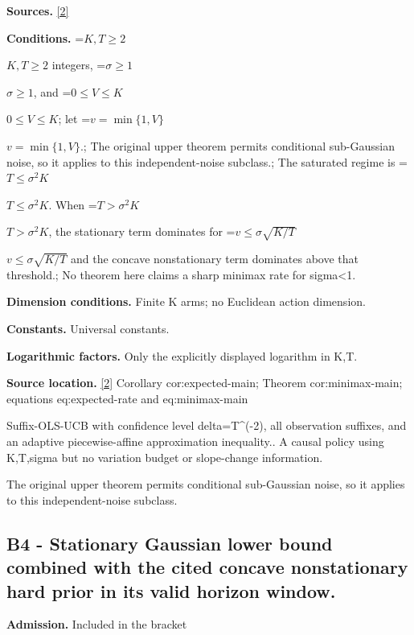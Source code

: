 \documentclass[10pt,a4paper]{article}
\newcommand{\AtlasMath}[1]{\par\begingroup\centering\setbox0=\hbox{$\displaystyle #1$}\ifdim\wd0>1.4\linewidth\typeout{ATLAS WIDE FORMULA: \the\wd0}\fi\ifdim\wd0>\linewidth\resizebox{\linewidth}{!}{\box0}\else\box0\fi\par\endgroup}
\newcommand{\AtlasInlineMath}[1]{\begingroup\setbox0=\hbox{$#1$}\ifdim\wd0>.4\linewidth\endgroup\AtlasMath{#1}\else\endgroup$#1$\fi}
\begin{document}
\textbf{Sources.} \href{https://github.com/WU-Wendao/Colombo/blob/main/colombo_sensorium/Complexity_altas/data/sources/colombo/U12/manuscript.pdf}{[2]}



\textbf{Conditions.} \AtlasInlineMath{K,T\ge2} integers, \AtlasInlineMath{\sigma\ge1}, and \AtlasInlineMath{0\le V\le K}; let \AtlasInlineMath{v=\min\{1,V\}}.; The original upper theorem permits conditional sub-Gaussian noise, so it applies to this independent-noise subclass.; The saturated regime is \AtlasInlineMath{T\le\sigma^2K}. When \AtlasInlineMath{T>\sigma^2K}, the stationary term dominates for \AtlasInlineMath{v\le\sigma\sqrt{K/T}} and the concave nonstationary term dominates above that threshold.; No theorem here claims a sharp minimax rate for sigma<1.



\textbf{Dimension conditions.} Finite K arms; no Euclidean action dimension.



\textbf{Constants.} Universal constants.



\textbf{Logarithmic factors.} Only the explicitly displayed logarithm in K,T.



\textbf{Source location.} \href{https://github.com/WU-Wendao/Colombo/blob/main/colombo_sensorium/Complexity_altas/data/sources/colombo/U12/manuscript.pdf}{[2]} Corollary cor:expected-main; Theorem cor:minimax-main; equations eq:expected-rate and eq:minimax-main



Suffix-OLS-UCB with confidence level delta=T\textasciicircum{}(-2), all observation suffixes, and an adaptive piecewise-affine approximation inequality.. A causal policy using K,T,sigma but no variation budget or slope-change information.



The original upper theorem permits conditional sub-Gaussian noise, so it applies to this independent-noise subclass.



\subsection{B4 - Stationary Gaussian lower bound combined with the cited concave nonstationary hard prior in its valid horizon window.}


\textbf{Admission.} Included in the bracket
\end{document}
